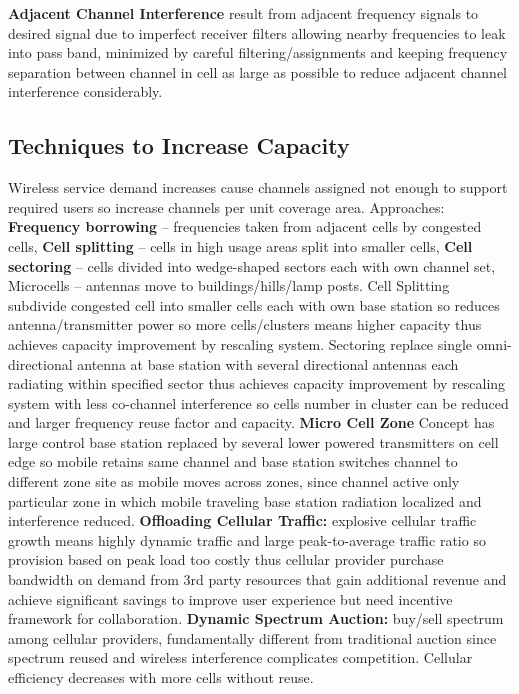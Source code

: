 \documentclass[9pt]{extarticle}
\begin{document}
\begin{multicols}{2}
\textbf{Adjacent Channel Interference }result from adjacent frequency signals to desired signal due to imperfect receiver filters allowing nearby frequencies to leak into pass band, minimized by careful filtering/assignments and keeping frequency separation between channel in cell as large as possible to reduce adjacent channel interference considerably.

\subsection{Techniques to Increase Capacity}

Wireless service demand increases cause channels assigned not enough to support required users so increase channels per unit coverage area. Approaches: \textbf{Frequency borrowing} – frequencies taken from adjacent cells by congested cells, \textbf{Cell splitting} – cells in high usage areas split into smaller cells, \textbf{Cell sectoring} – cells divided into wedge-shaped sectors each with own channel set, Microcells – antennas move to buildings/hills/lamp posts. Cell Splitting subdivide congested cell into smaller cells each with own base station so reduces antenna/transmitter power so more cells/clusters means higher capacity thus achieves capacity improvement by rescaling system. Sectoring replace single omni-directional antenna at base station with several directional antennas each radiating within specified sector thus achieves capacity improvement by rescaling system with less co-channel interference so cells number in cluster can be reduced and larger frequency reuse factor and capacity.\textbf{ Micro Cell Zone} Concept has large control base station replaced by several lower powered transmitters on cell edge so mobile retains same channel and base station switches channel to different zone site as mobile moves across zones, since channel active only particular zone in which mobile traveling base station radiation localized and interference reduced. \textbf{Offloading Cellular Traffic:} explosive cellular traffic growth means highly dynamic traffic and large peak-to-average traffic ratio so provision based on peak load too costly thus cellular provider purchase bandwidth on demand from 3rd party resources that gain additional revenue and achieve significant savings to improve user experience but need incentive framework for collaboration. \textbf{Dynamic Spectrum Auction:} buy/sell spectrum among cellular providers, fundamentally different from traditional auction since spectrum reused and wireless interference complicates competition. Cellular efficiency decreases with more cells without reuse.


\end{multicols}
\end{document}
